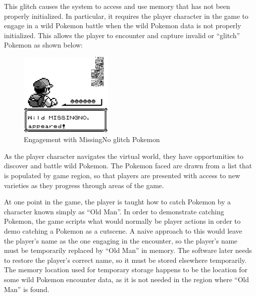 \documentclass[letterpaper]{article}
\begin{document}
This glitch causes the system to access and use memory that has not been properly initialized. In particular, it requires the player character in the game to engage in a wild Pokemon battle when the wild Pokemon data is not properly initialized. This allows the player to encounter and capture invalid or ``glitch'' Pokemon as shown below:

\begin{figure}[h!]
    \centering
    \includegraphics[width=0.4\textwidth]{missingno.png}
    \caption{Engagement with MissingNo glitch Pokemon}
\end{figure}

As the player character navigates the virtual world, they have opportunities to discover and battle wild Pokemon. The Pokemon faced are drawn from a list that is populated by game region, so that players are presented with access to new varieties as they progress through areas of the game.

At one point in the game, the player is taught how to catch Pokemon by a character known simply as ``Old Man''. In order to demonstrate catching Pokemon, the game scripts what would normally be player actions in order to demo catching a Pokemon as a cutscene. A naive approach to this would leave the player's name as the one engaging in the encounter, so the player's name must be temporarily replaced by ``Old Man'' in memory. The software later needs to restore the player's correct name, so it must be stored elsewhere temporarily. The memory location used for temporary storage happens to be the location for some wild Pokemon encounter data, as it is not needed in the region where ``Old Man'' is found.
\end{document}
